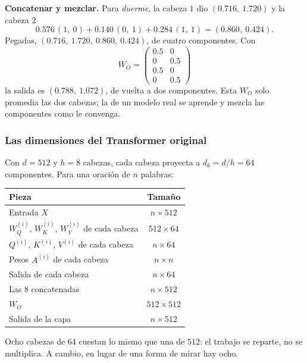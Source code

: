 \documentclass[11pt,letterpaper]{article}
\begin{document}
\begin{ejemplo}
    \textbf{Concatenar y mezclar.} Para \textit{duerme}, la cabeza $1$
    dio $(0.716,\ 1.720)$ y la cabeza $2$
    \[
        0.576\,(1,\ 0) + 0.140\,(0,\ 1) + 0.284\,(1,\ 1)
        = (0.860,\ 0.424) .
    \]
    Pegadas, $(0.716,\ 1.720,\ 0.860,\ 0.424)$, de cuatro componentes.
    Con
    \[
        W_O = \begin{pmatrix} 0.5 & 0 \\ 0 & 0.5 \\ 0.5 & 0 \\
                              0 & 0.5 \end{pmatrix}
    \]
    la salida es $(0.788,\ 1.072)$, de vuelta a dos componentes. Esta
    $W_O$ solo promedia las dos cabezas; la de un modelo real se
    aprende y mezcla las componentes como le convenga.
\end{ejemplo}

\subsubsection*{Las dimensiones del Transformer original}

Con $d = 512$ y $h = 8$ cabezas, cada cabeza proyecta a
$d_k = d / h = 64$ componentes. Para una oración de $n$ palabras:

\begin{center}
\begin{tabular}{lc}
    \toprule
    \textbf{Pieza} & \textbf{Tamaño} \\
    \midrule
    Entrada $X$ & $n \times 512$ \\
    $W_Q^{(i)}$, $W_K^{(i)}$, $W_V^{(i)}$ de cada cabeza
        & $512 \times 64$ \\
    $Q^{(i)}$, $K^{(i)}$, $V^{(i)}$ de cada cabeza & $n \times 64$ \\
    Pesos $A^{(i)}$ de cada cabeza & $n \times n$ \\
    Salida de cada cabeza & $n \times 64$ \\
    Las $8$ concatenadas & $n \times 512$ \\
    $W_O$ & $512 \times 512$ \\
    Salida de la capa & $n \times 512$ \\
    \bottomrule
\end{tabular}
\end{center}

Ocho cabezas de $64$ cuestan lo mismo que una de $512$: el trabajo se
reparte, no se multiplica. A cambio, en lugar de una forma de mirar
hay ocho.
\end{document}
